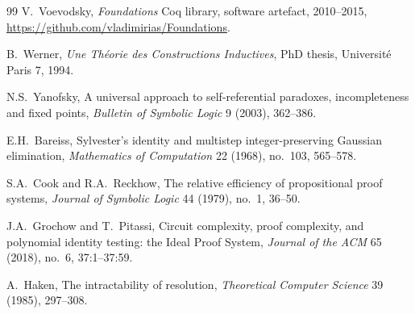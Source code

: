 \documentclass[11pt]{article}
\theoremstyle{plain}
\theoremstyle{definition}
\begin{document}
\begin{thebibliography}{99}
V.~Voevodsky,
\newblock \emph{Foundations} Coq library,
\newblock software artefact, 2010--2015,
\newblock \url{https://github.com/vladimirias/Foundations}.

B.~Werner,
\newblock \emph{Une Th\'eorie des Constructions Inductives},
\newblock PhD thesis, Universit\'e Paris 7, 1994.

N.S.~Yanofsky,
\newblock A universal approach to self-referential paradoxes, incompleteness and fixed points,
\newblock \emph{Bulletin of Symbolic Logic} 9 (2003), 362--386.

E.H.~Bareiss,
\newblock Sylvester's identity and multistep integer-preserving Gaussian elimination,
\newblock \emph{Mathematics of Computation} 22 (1968), no.~103, 565--578.

S.A.~Cook and R.A.~Reckhow,
\newblock The relative efficiency of propositional proof systems,
\newblock \emph{Journal of Symbolic Logic} 44 (1979), no.~1, 36--50.

J.A.~Grochow and T.~Pitassi,
\newblock Circuit complexity, proof complexity, and polynomial identity testing: the Ideal Proof System,
\newblock \emph{Journal of the ACM} 65 (2018), no.~6, 37:1--37:59.

A.~Haken,
\newblock The intractability of resolution,
\newblock \emph{Theoretical Computer Science} 39 (1985), 297--308.

\end{thebibliography}
\end{document}

